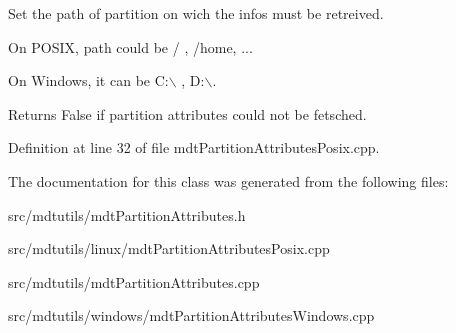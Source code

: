 Set the path of partition on wich the infos must be retreived. 

On POSIX, path could be / , /home, ...\par
 On Windows, it can be C:$\backslash$ , D:$\backslash$. \begin{DoxyReturn}{Returns}
False if partition attributes could not be fetsched. 
\end{DoxyReturn}


Definition at line 32 of file mdtPartitionAttributesPosix.cpp.



The documentation for this class was generated from the following files:\begin{DoxyCompactItemize}
\item 
src/mdtutils/mdtPartitionAttributes.h\item 
src/mdtutils/linux/mdtPartitionAttributesPosix.cpp\item 
src/mdtutils/mdtPartitionAttributes.cpp\item 
src/mdtutils/windows/mdtPartitionAttributesWindows.cpp\end{DoxyCompactItemize}
